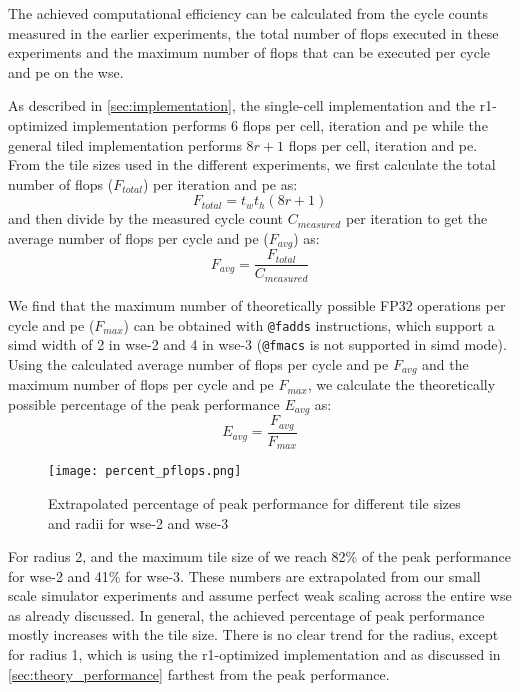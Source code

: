 The achieved computational efficiency can be calculated from the cycle counts measured in the earlier experiments, the total number of \acp{flop} executed in these experiments and the maximum number of \acp{flop} that can be executed per cycle and \ac{pe} on the \ac{wse}.

As described in \autoref{sec:implementation}, the single-cell implementation and the r1-optimized implementation performs \num{6} \acp{flop} per cell, iteration and \ac{pe} while the general tiled implementation performs $8r+1$ \acp{flop} per cell, iteration and \ac{pe}. From the tile sizes used in the different experiments, we first calculate the total number of \acp{flop} ($F_{total}$) per iteration and \ac{pe} as:
\begin{equation}
    F_{total} = t_w t_h (8r+1)
\end{equation}
and then divide by the measured cycle count $C_{measured}$ per iteration to get the average number of \acp{flop} per cycle and \ac{pe} ($F_{avg}$) as:
\begin{equation}
    F_{avg} = \frac{F_{total}}{C_{measured}}
\end{equation}

We find that the maximum number of theoretically possible FP32 operations per cycle and \ac{pe} ($F_{max}$) can be obtained with \texttt{@fadds} instructions, which support a \ac{simd} width of 2 in \ac{wse}-2 and 4 in \ac{wse}-3 (\texttt{@fmacs} is not supported in \ac{simd} mode). Using the calculated average number of \acp{flop} per cycle and \ac{pe} $F_{avg}$ and the maximum number of \acp{flop} per cycle and \ac{pe} $F_{max}$, we calculate the theoretically possible percentage of the peak performance $E_{avg}$ as:
\begin{equation}
    E_{avg} = \frac{F_{avg}}{F_{max}}
\end{equation}

\begin{figure}[h]
    \centering
    \texttt{[image: percent\_pflops.png]}
    \caption{Extrapolated percentage of peak performance for different tile sizes and radii for \ac{wse}-2 and \ac{wse}-3}
    \label{fig:percent_pflops}
\end{figure}

For radius 2, and the maximum tile size of  we reach \num{82}\% of the peak performance for \ac{wse}-2 and \num{41}\% for \ac{wse}-3.
These numbers are extrapolated from our small scale simulator experiments and assume perfect weak scaling across the entire \ac{wse} as already discussed. 
In general, the achieved percentage of peak performance mostly increases with the tile size. There is no clear trend for the radius, except for radius 1, which is using the r1-optimized implementation and as discussed in \autoref{sec:theory_performance} farthest from the peak performance.

